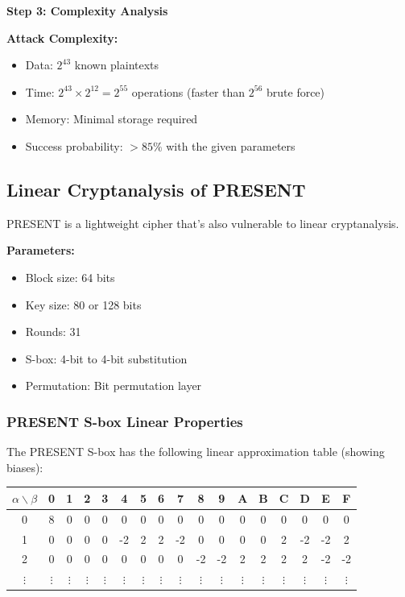 \documentclass[12pt,a4paper]{article}
\begin{document}
\textbf{Step 3: Complexity Analysis}

\begin{statisticsbox}
\textbf{Attack Complexity:}
\begin{itemize}
    \item Data: $2^{43}$ known plaintexts
    \item Time: $2^{43} \times 2^{12} = 2^{55}$ operations (faster than $2^{56}$ brute force)
    \item Memory: Minimal storage required
    \item Success probability: $>85\%$ with the given parameters
\end{itemize}
\end{statisticsbox}

\subsection{Linear Cryptanalysis of PRESENT}

PRESENT is a lightweight cipher that's also vulnerable to linear cryptanalysis.

\begin{examplebox}[title=PRESENT Cipher Specification]
\textbf{Parameters:}
\begin{itemize}
    \item Block size: 64 bits
    \item Key size: 80 or 128 bits
    \item Rounds: 31
    \item S-box: 4-bit to 4-bit substitution
    \item Permutation: Bit permutation layer
\end{itemize}
\end{examplebox}

\subsubsection{PRESENT S-box Linear Properties}

The PRESENT S-box has the following linear approximation table (showing biases):

\begin{center}
\scriptsize
\begin{tabular}{c|*{16}{c}}
$\alpha \backslash \beta$ & 0 & 1 & 2 & 3 & 4 & 5 & 6 & 7 & 8 & 9 & A & B & C & D & E & F \\
\hline
0 & 8 & 0 & 0 & 0 & 0 & 0 & 0 & 0 & 0 & 0 & 0 & 0 & 0 & 0 & 0 & 0 \\
1 & 0 & 0 & 0 & 0 & -2 & 2 & 2 & -2 & 0 & 0 & 0 & 0 & 2 & -2 & -2 & 2 \\
2 & 0 & 0 & 0 & 0 & 0 & 0 & 0 & 0 & -2 & -2 & 2 & 2 & 2 & 2 & -2 & -2 \\
$\vdots$ & $\vdots$ & $\vdots$ & $\vdots$ & $\vdots$ & $\vdots$ & $\vdots$ & $\vdots$ & $\vdots$ & $\vdots$ & $\vdots$ & $\vdots$ & $\vdots$ & $\vdots$ & $\vdots$ & $\vdots$ & $\vdots$ \\
\end{tabular}
\end{center}
\end{document}
